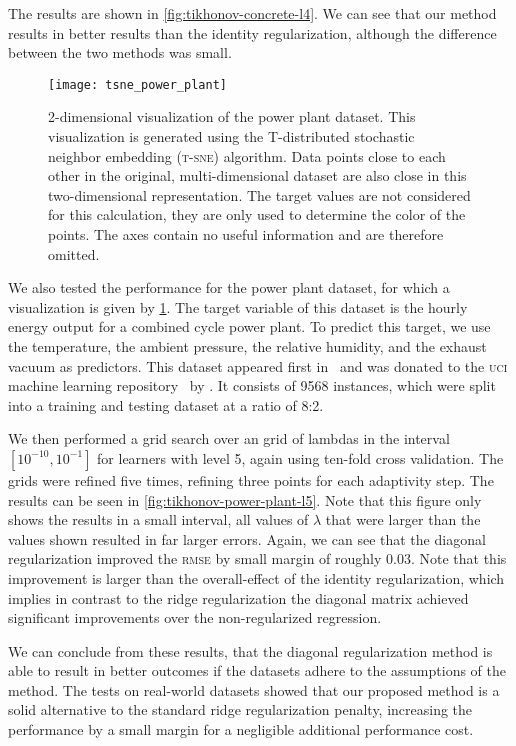 The results are shown in \cref{fig:tikhonov-concrete-l4}.
We can see that our method results in better results than the identity
regularization, although the difference between the two methods was small.
\FloatBarrier{}
\begin{figure}[htb]
  \centering
  \texttt{[image: tsne\_power\_plant]}
  \caption[\textsc{t-sne} plot for the power plant dataset]{
2-dimensional visualization of the power plant dataset. This visualization is generated using the T-distributed stochastic neighbor embedding (\textsc{t-sne}) algorithm. Data points close to each other in the
  original, multi-dimensional dataset are also close in this two-dimensional
  representation. The target values are not considered for this calculation, they
are only used to determine the color of the points. The axes contain no useful
information and are therefore omitted.
}
  \label{fig:tsne-power-plant}
\end{figure}
We also tested the performance for the power plant dataset, for which a visualization is given by \cref{fig:tsne-power-plant}.
The target variable of this dataset is the hourly energy output for a combined
cycle power plant.
To predict this target, we use the temperature, the ambient pressure, the
relative humidity, and the exhaust vacuum as predictors.
This dataset appeared first in~\cite{datasets-powerplant} and was donated to the
\textsc{uci} machine learning repository~\cite{datasets-uci} by \citeauthor{datasets-powerplant}.
It consists of 9568 instances, which were split into a training and testing
dataset at a ratio of 8:2.

We then performed a grid search over an grid of lambdas in the interval
\([10^{-10}, 10^{-1}]\) for learners with level 5, again using ten-fold cross validation.
The grids were refined five times, refining three points for each adaptivity step.
The results can be seen in \cref{fig:tikhonov-power-plant-l5}.
Note that this figure only shows the results in a small interval, all values of
\(\lambda\) that were larger than the values shown resulted in far larger
errors.
Again, we can see that the diagonal regularization improved the \textsc{rmse} by
small margin of roughly 0.03.
Note that this improvement is larger than the overall-effect of the identity
regularization, which implies in contrast to the ridge regularization the
diagonal matrix achieved significant improvements over the non-regularized regression.

We can conclude from these results, that the diagonal regularization method is
able to result in better outcomes if the datasets adhere to the assumptions of
the method.
The tests on real-world datasets showed that our proposed method is a solid alternative
to the standard ridge regularization penalty, increasing the performance by a
small margin for a negligible additional performance cost.

